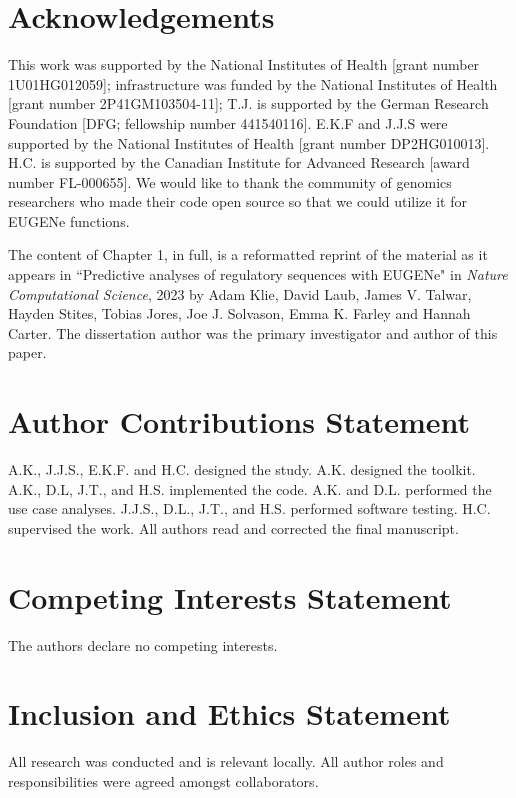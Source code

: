 \section{Acknowledgements}

This work was supported by the National Institutes of Health [grant number 1U01HG012059]; infrastructure was funded by the National Institutes of Health [grant number 2P41GM103504-11]; T.J. is supported by the German Research Foundation [DFG; fellowship number 441540116]. E.K.F and J.J.S were supported by the National Institutes of Health [grant number DP2HG010013]. H.C. is supported by the Canadian Institute for Advanced Research [award number FL-000655]. We would like to thank the community of genomics researchers who made their code open source so that we could utilize it for EUGENe functions.

The content of Chapter 1, in full, is a reformatted reprint of the material as it appears in “Predictive analyses of regulatory sequences with EUGENe" in \textit{Nature Computational Science}, 2023 by Adam Klie, David Laub, James V. Talwar, Hayden Stites, Tobias Jores, Joe J. Solvason, Emma K. Farley and Hannah Carter. The dissertation author was the primary investigator and author of this paper.

\section{Author Contributions Statement}

A.K., J.J.S., E.K.F. and H.C. designed the study. A.K. designed the toolkit. A.K., D.L, J.T., and H.S. implemented the code. A.K. and D.L. performed the use case analyses. J.J.S., D.L., J.T., and H.S. performed software testing. H.C. supervised the work. All authors read and corrected the final manuscript.

\section{Competing Interests Statement}

The authors declare no competing interests.

\section{Inclusion and Ethics Statement}

All research was conducted and is relevant locally. All author roles and responsibilities were agreed amongst collaborators.
